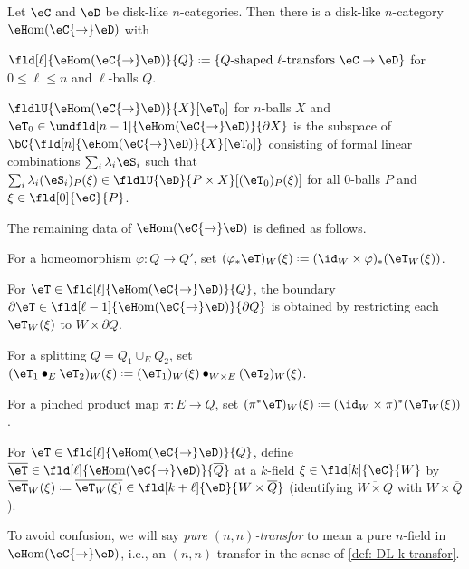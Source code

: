 \documentclass[12pt,reqno]{amsart}
\newcommand{\eFun}{{\eH}\mathrm{om}}
\newcommand{\C}{\eC}
\newcommand{\D}{\eD}
\newcommand{\blt}{\bullet}
\newcommand{\fcj}[1]{\overline{#1}}
\newcommand{\orev}{\overline}
\newcommand{\defn}[1]{\emph{#1}}
\DeclareRobustCommand{\coloneq}{\mathrel{\vcenter{\baselineskip0.5ex\lineskiplimit0pt\hbox{\scriptsize{\upshape.}}\hbox{\scriptsize{\upshape.}}}}=}
\begin{document}
\begin{construction}
\label{def: functor disk-like n-category}
Let $\C$ and $\D$ be disk-like $n$-categories. Then there is a disk-like $n$-category $\eFun(\C{\to}\D)$ with
  \begin{lst}
    \item[\ref{DCk}] $\fld[\ell]{\eFun(\C{\to}\D)}{Q}\coloneq\{Q\text{-shaped }\ell\text{-transfors }\C\to\D\}$ for $0\leq \ell\leq n$ and $\ell$-balls $Q$.
    \item[\ref{DCU}] $\fldlU{\eFun(\C{\to}\D)}{X}[\eT_0]$ for $n$-balls $X$ and $\eT_0\in\undfld[n-1]{\eFun(\C{\to}\D)}{\partial X}$ is the subspace of $\bC\{\fld[n]{\eFun(\C{\to}\D)}{X}[ \eT_0]\}$ consisting of formal linear combinations $\sum_i\lambda_i\eS_i$ such that $\sum_i\lambda_i(\eS_i)_P(\xi)\in\fldlU{\D}{P\times X}[ (\eT_0)_P(\xi)]$ for all $0$-balls $P$ and $\xi\in\fld[0]{\C}{P}$.
  \end{lst}
  The remaining data of $\eFun(\C{\to}\D)$ is defined as follows.
  \begin{lst}
    \item[\ref{Dvarphi}] For a homeomorphism $\varphi \colon Q \to Q'$, set $(\varphi_*\eT)_W(\xi) \coloneq (\id_W \times \varphi)_*(\eT_W(\xi))$.
    \item[\ref{Dbdk}] For $\eT\in\fld[\ell]{\eFun(\C{\to}\D)}{Q}$, the boundary $\partial\eT\in\fld[\ell-1]{\eFun(\C{\to}\D)}{\partial Q}$ is obtained by restricting each $\eT_W(\xi)$ to $W\times \partial Q$.
    \item[\ref{DGk}] For a splitting $Q = Q_1 \cup_E Q_2$, set $(\eT_1 \blt_E \eT_2)_W(\xi) \coloneq (\eT_1)_W(\xi) \blt_{W \times E} (\eT_2)_W(\xi)$.
    \item[\ref{Dpik}] For a pinched product map $\pi \colon E \to Q$, set $(\pi^*\eT)_W(\xi) \coloneq (\id_W \times \pi)^*(\eT_W(\xi))$.
    \item[\ref{Drefl}] For $\eT\in\fld[\ell]{\eFun(\C{\to}\D)}{Q}$, define $\fcj\eT \in \fld[\ell]{\eFun(\C{\to}\D)}{\orev{Q}}$ at a $k$-field $\xi\in\fld[k]{\C}{W}$ by $\fcj{\eT}_W(\xi) \coloneq \fcj{\eT_W(\xi)}  \in \fld[k+\ell]{\D}{W \times \orev{Q}}$ (identifying $\orev{W\times Q}$ with $W\times\orev{Q}$).
  \end{lst}
\end{construction}

To avoid confusion, we will say \defn{pure $(n,n)$-transfor} to mean a pure $n$-field in {$\eFun(\C{\to}\D)$}, i.e., an $(n,n)$-transfor in the sense of \cref{def: DL k-transfor}.
\end{document}
